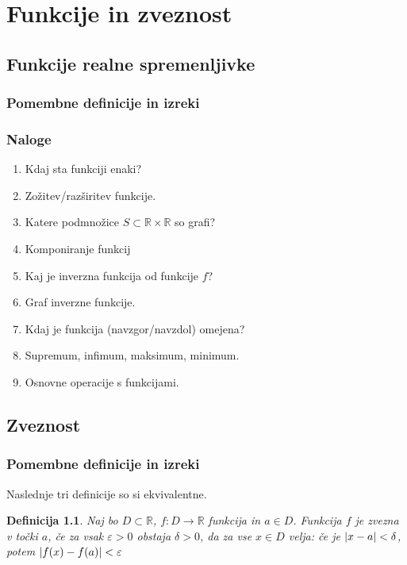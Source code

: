 \documentclass[a4paper,12pt]{report}
\newtheorem{definicija}[izrek]{Definicija}
\begin{document}
\chapter{Funkcije in zveznost}

\section*{Funkcije realne spremenljivke}

\subsection*{Pomembne definicije in izreki}



\subsection*{Naloge}

\begin{enumerate}
    \item Kdaj sta funkciji enaki?
    \item Zožitev/razširitev funkcije.
    \item Katere podmnožice $S \subset \mathbb{R} \times \mathbb{R}$ so grafi?
    \item Komponiranje funkcij
    \item Kaj je inverzna funkcija od funkcije $f$?
    \item Graf inverzne funkcije.
    \item Kdaj je funkcija (navzgor/navzdol) omejena?
    \item Supremum, infimum, maksimum, minimum.
    \item Osnovne operacije s funkcijami.
\end{enumerate}

\pagebreak

\section*{Zveznost}


\subsection*{Pomembne definicije in izreki}
Naslednje tri definicije so si ekvivalentne.
\begin{definicija}
    Naj bo $D \subset \mathbb{R}$, $f: D \to \mathbb{R}$ funkcija in $a \in D$. 
    Funkcija $f$ je zvezna v točki $a$, če za vsak $\varepsilon>0$ obstaja $\delta>0$, da 
    za vse $x \in D$ velja: če je $\abs{x-a} < \delta$, potem $\abs{f(x)-f(a)} < \varepsilon$
\end{definicija}
\end{document}
